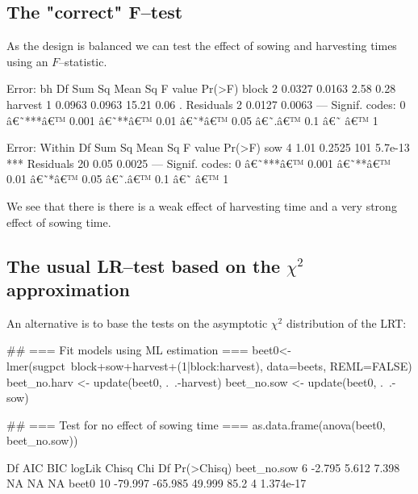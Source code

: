 \documentclass[12pt]{article}
\begin{document}
\subsection{The "correct" F--test}
\label{sec:correct-f-test}

As the design is balanced we can test the effect of sowing and
harvesting times using an $F$--statistic.

\begin{Schunk}
\begin{Soutput}
Error: bh
          Df Sum Sq Mean Sq F value Pr(>F)  
block      2 0.0327  0.0163    2.58   0.28  
harvest    1 0.0963  0.0963   15.21   0.06 .
Residuals  2 0.0127  0.0063                 
---
Signif. codes:  0 â€˜***â€™ 0.001 â€˜**â€™ 0.01 â€˜*â€™ 0.05 â€˜.â€™ 0.1 â€˜ â€™ 1 

Error: Within
          Df Sum Sq Mean Sq F value  Pr(>F)    
sow        4   1.01  0.2525     101 5.7e-13 ***
Residuals 20   0.05  0.0025                    
---
Signif. codes:  0 â€˜***â€™ 0.001 â€˜**â€™ 0.01 â€˜*â€™ 0.05 â€˜.â€™ 0.1 â€˜ â€™ 1 
\end{Soutput}
\end{Schunk}

We see that there is there is a weak effect of harvesting time and a
very strong effect of sowing time.

\subsection{The usual LR--test based on the $\chi^2$ approximation}
\label{sec:usual-lr-test}

An alternative is to base the tests on the asymptotic $\chi^2$ distribution of
the LRT:
\begin{Schunk}
\begin{Sinput}
 ## === Fit models using ML estimation ===
 beet0<-lmer(sugpct~block+sow+harvest+(1|block:harvest), data=beets, REML=FALSE)
 beet_no.harv <- update(beet0, .~.-harvest)
 beet_no.sow  <- update(beet0, .~.-sow)
\end{Sinput}
\end{Schunk}


\begin{Schunk}
\begin{Sinput}
 ## === Test for no effect of sowing time ===
 as.data.frame(anova(beet0, beet_no.sow))
\end{Sinput}
\begin{Soutput}
            Df     AIC     BIC logLik Chisq Chi Df Pr(>Chisq)
beet_no.sow  6  -2.795   5.612  7.398    NA     NA         NA
beet0       10 -79.997 -65.985 49.999  85.2      4  1.374e-17
\end{Soutput}
\end{Schunk}
\end{document}
